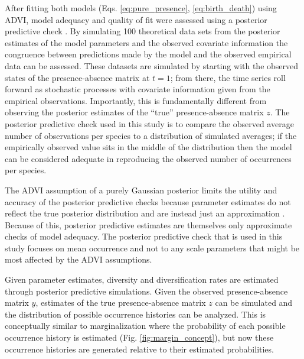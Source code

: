 After fitting both models (Eqs. \ref{eq:pure_presence}, \ref{eq:birth_death}) using ADVI, model adequacy and quality of fit were assessed using a posterior predictive check \citep{Gelman2013d}. By simulating 100 theoretical data sets from the posterior estimates of the model parameters and the observed covariate information the congruence between predictions made by the model and the observed empirical data can be assessed. These datasets are simulated by starting with the observed states of the presence-absence matrix at \(t = 1\); from there, the time series roll forward as stochastic processes with covariate information given from the empirical observations. Importantly, this is fundamentally different from observing the posterior estimates of the ``true'' presence-absence matrix \(z\). The posterior predictive check used in this study is to compare the observed average number of observations per species to a distribution of simulated averages; if the empirically observed value sits in the middle of the distribution then the model can be considered adequate in reproducing the observed number of occurrences per species. 

The ADVI assumption of a purely Gaussian posterior limits the utility and accuracy of the posterior predictive checks because parameter estimates do not reflect the true posterior distribution and are instead just an approximation \citep{Gelman2013d}. Because of this, posterior predictive estimates are themselves only approximate checks of model adequacy. The posterior predictive check that is used in this study focuses on mean occurrence and not to any scale parameters that might be most affected by the ADVI assumptions.


Given parameter estimates, diversity and diversification rates are estimated through posterior predictive simulations. Given the observed presence-absence matrix \(y\), estimates of the true presence-absence matrix \(z\) can be simulated and the distribution of possible occurrence histories can be analyzed. This is conceptually similar to marginalization where the probability of each possible occurrence history is estimated (Fig. \ref{fig:margin_concept}), but now these occurrence histories are generated relative to their estimated probabilities.


